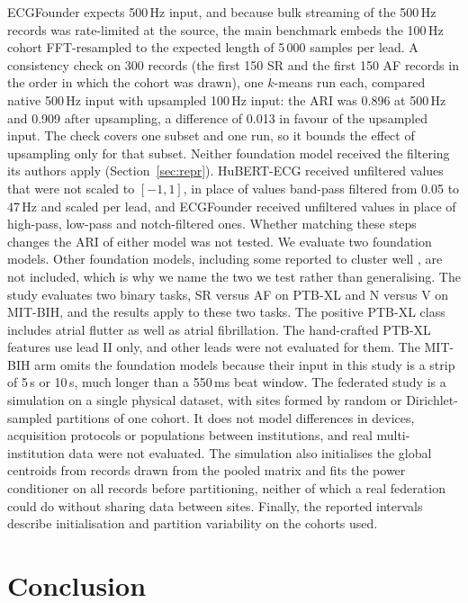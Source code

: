 \documentclass[preprint,11pt]{elsarticle}
\begin{document}
ECGFounder expects 500\,Hz input, and because bulk streaming of the 500\,Hz records was
rate-limited at the source, the main benchmark embeds the 100\,Hz cohort FFT-resampled to
the expected length of 5\,000 samples per lead. A consistency check on 300 records (the
first 150 SR and the first 150 AF records in the order in which the cohort was drawn), one
$k$-means run each, compared native 500\,Hz input with upsampled 100\,Hz input: the ARI
was 0.896 at 500\,Hz and 0.909 after upsampling, a difference of 0.013 in favour of the
upsampled input. The check covers one subset and one run, so it bounds the effect of
upsampling only for that subset. Neither foundation model received the filtering its
authors apply (Section~\ref{sec:repr}). HuBERT-ECG received unfiltered values that were not
scaled to $[-1,1]$, in place of values band-pass filtered from 0.05 to 47\,Hz and scaled
per lead, and ECGFounder received unfiltered values in place of high-pass, low-pass and
notch-filtered ones. Whether matching these steps changes the ARI of either model was not
tested. We evaluate two foundation models. Other foundation models, including some
reported to cluster well \cite{lookingbeyond2026}, are not included, which is why we name
the two we test rather than generalising. The study evaluates two binary tasks, SR versus
AF on PTB-XL and N versus V on MIT-BIH, and the results apply to these two tasks. The
positive PTB-XL class includes atrial flutter as well as
atrial fibrillation. The hand-crafted PTB-XL features use lead II only, and other leads
were not evaluated for them. The MIT-BIH arm omits the foundation models because their
input in this study is a strip of 5\,s or 10\,s, much longer than a 550\,ms beat window.
The federated study is a simulation on a single physical dataset, with sites formed by
random or Dirichlet-sampled partitions of one cohort. It does not model differences in
devices, acquisition protocols or populations between institutions, and real
multi-institution data were not evaluated. The simulation also initialises the global
centroids from records drawn from the pooled matrix and fits the power conditioner on all
records before partitioning, neither of which a real federation could do without sharing
data between sites. Finally, the reported intervals describe initialisation and partition
variability on the cohorts used.

\section{Conclusion}\label{sec:conclusion}
\end{document}

